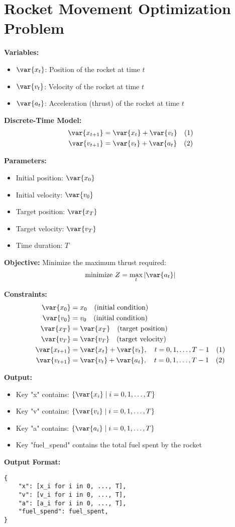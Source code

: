 \documentclass{article}
\begin{document}
\section*{Rocket Movement Optimization Problem}

\textbf{Variables:}
\begin{itemize}
    \item $\var{x_t}$: Position of the rocket at time $t$
    \item $\var{v_t}$: Velocity of the rocket at time $t$
    \item $\var{a_t}$: Acceleration (thrust) of the rocket at time $t$
\end{itemize}

\textbf{Discrete-Time Model:}
\begin{align}
    \var{x_{t+1}} &= \var{x_t} + \var{v_t} \quad \text{(1)} \\
    \var{v_{t+1}} &= \var{v_t} + \var{a_t} \quad \text{(2)}
\end{align}

\textbf{Parameters:}
\begin{itemize}
    \item Initial position: $\var{x_0}$
    \item Initial velocity: $\var{v_0}$
    \item Target position: $\var{x_T}$
    \item Target velocity: $\var{v_T}$
    \item Time duration: $T$
\end{itemize}

\textbf{Objective:}
Minimize the maximum thrust required:
\[
\text{minimize } Z = \max_{t} |\var{a_t}|
\]

\textbf{Constraints:}
\begin{align}
    \var{x_0} &= x_0 \quad \text{(initial condition)} \\
    \var{v_0} &= v_0 \quad \text{(initial condition)} \\
    \var{x_T} &= \var{x_T} \quad \text{(target position)} \\
    \var{v_T} &= \var{v_T} \quad \text{(target velocity)} \\
    \var{x_{t+1}} &= \var{x_t} + \var{v_t}, \quad t = 0, 1, \ldots, T-1 \quad \text{(1)} \\
    \var{v_{t+1}} &= \var{v_t} + \var{a_t}, \quad t = 0, 1, \ldots, T-1 \quad \text{(2)}
\end{align}

\textbf{Output:}
\begin{itemize}
    \item Key "x" contains: $\{ \var{x_i} \;|\; i = 0, 1, \ldots, T \}$
    \item Key "v" contains: $\{ \var{v_i} \;|\; i = 0, 1, \ldots, T \}$
    \item Key "a" contains: $\{ \var{a_i} \;|\; i = 0, 1, \ldots, T \}$
    \item Key "fuel\_spend" contains the total fuel spent by the rocket
\end{itemize}

\textbf{Output Format:}
\begin{verbatim}
{
    "x": [x_i for i in 0, ..., T],
    "v": [v_i for i in 0, ..., T],
    "a": [a_i for i in 0, ..., T],
    "fuel_spend": fuel_spent,
}
\end{verbatim}
\end{document}
